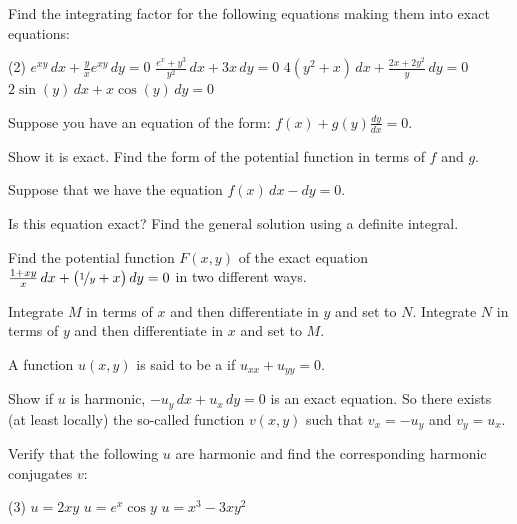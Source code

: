 \begin{exercise}
Find the integrating factor for the following equations making them into
exact equations:
\begin{tasks}(2)
\task
$e^{xy} \, dx + \frac{y}{x} e^{xy} \, dy = 0$
\task
$\frac{e^x+y^3}{y^2} \, dx + 3x \, dy = 0$
\task
$4(y^2+x) \, dx + \frac{2x+2y^2}{y} \, dy = 0$
\task
$2\sin(y) \, dx + x\cos(y)\, dy = 0$
\end{tasks}
\end{exercise}

\begin{exercise}
Suppose you have an equation of the form:
$f(x) + g(y) \frac{dy}{dx} = 0$.
\begin{tasks}
\task
Show it is exact.
\task
Find the form of the potential function in terms of $f$ and $g$.
\end{tasks}
\end{exercise}

\begin{exercise}
Suppose that we have the equation $f(x) \, dx - dy = 0$.
\begin{tasks}
\task
Is this equation exact?
\task
Find the general solution using a definite integral.
\end{tasks}
\end{exercise}

\begin{exercise}
Find the potential function $F(x,y)$ of the exact equation $\frac{1+xy}{x}\, dx +
\bigl(\nicefrac{1}{y} + x \bigr) \, dy = 0$ in two different ways.
\begin{tasks}
\task
Integrate $M$ in terms of $x$ and then differentiate in $y$ and set to
$N$.
\task
Integrate $N$ in terms of $y$ and then differentiate in $x$ and set to
$M$.
\end{tasks}
\end{exercise}

\begin{samepage}
\begin{exercise}
A function $u(x,y)$ is said to be a \emph{} if
$u_{xx} + u_{yy} = 0$.
\begin{tasks}
\task
Show if $u$ is harmonic, $-u_y \, dx + u_x \, dy = 0$ is an exact
equation.  So there exists (at least locally)
the so-called \emph{} function
$v(x,y)$ such that $v_x = -u_y$ and $v_y = u_x$.
\end{tasks}
Verify that the following $u$ are harmonic and 
find the corresponding harmonic conjugates $v$:
\begin{tasks}[resume](3)
\task $u = 2xy$
\task $u = e^x \cos y$
\task $u = x^3-3xy^2$
\end{tasks}
\end{exercise}
\end{samepage}

